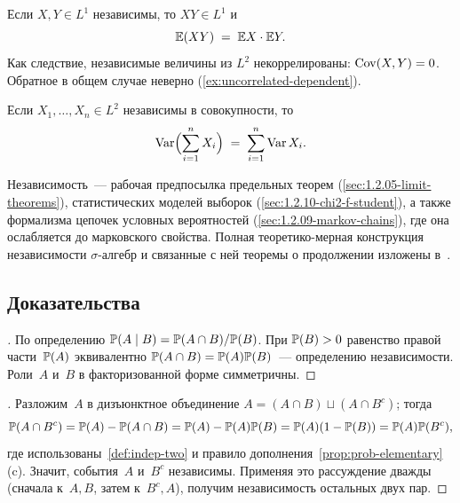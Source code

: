 \begin{theorem}
\label{thm:indep-multiplicative}
Если $X, Y \in L^1$ независимы, то $XY \in L^1$ и
\[
  \mathbb{E}(XY) \;=\; \mathbb{E} X \cdot \mathbb{E} Y.
\]
Как следствие, независимые величины из $L^2$ некоррелированы: $\operatorname{Cov}(X, Y) = 0$. Обратное в общем случае неверно (\cref{ex:uncorrelated-dependent}).
\end{theorem}

\begin{corollary}
\label{cor:var-sum-indep}
Если $X_1, \dots, X_n \in L^2$ независимы в совокупности, то
\[
  \operatorname{Var}\Bigl(\sum_{i=1}^{n} X_i\Bigr) \;=\; \sum_{i=1}^{n} \operatorname{Var} X_i.
\]
\end{corollary}

\begin{remark}
Независимость~--- рабочая предпосылка предельных теорем (\cref{sec:1.2.05-limit-theorems}), статистических моделей выборок (\cref{sec:1.2.10-chi2-f-student}), а также формализма цепочек условных вероятностей (\cref{sec:1.2.09-markov-chains}), где она ослабляется до марковского свойства. Полная теоретико-мерная конструкция независимости $\sigma$-алгебр и связанные с ней теоремы о продолжении изложены в~\cite[гл.~II, \S~5]{Shiryaev1989}.
\end{remark}

\subsection*{Доказательства}

\begin{proof}[]
По определению $\mathbb{P}(A \mid B) = \mathbb{P}(A \cap B) / \mathbb{P}(B)$. При $\mathbb{P}(B) > 0$ равенство правой части~$\mathbb{P}(A)$ эквивалентно $\mathbb{P}(A \cap B) = \mathbb{P}(A) \mathbb{P}(B)$~--- определению независимости. Роли~$A$ и~$B$ в факторизованной форме симметричны.
\end{proof}

\begin{proof}[]
Разложим~$A$ в дизъюнктное объединение $A = (A \cap B) \sqcup (A \cap B^c)$; тогда
\[
  \mathbb{P}(A \cap B^c) = \mathbb{P}(A) - \mathbb{P}(A \cap B) = \mathbb{P}(A) - \mathbb{P}(A) \mathbb{P}(B) = \mathbb{P}(A) (1 - \mathbb{P}(B)) = \mathbb{P}(A) \mathbb{P}(B^c),
\]
где использованы~\cref{def:indep-two} и правило дополнения~\cref{prop:prob-elementary}\,(c). Значит, события~$A$ и~$B^c$ независимы. Применяя это рассуждение дважды (сначала к~$A, B$, затем к~$B^c, A$), получим независимость остальных двух пар.
\end{proof}

